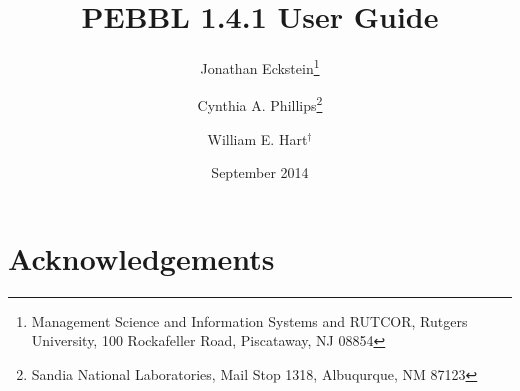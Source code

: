 \documentclass[12pt]{article}
\begin{document}
\title{
PEBBL 1.4.1 User Guide
}

\author{
Jonathan Eckstein\thanks{
Management Science and Information Systems and RUTCOR, Rutgers University,
100 Rockafeller Road, Piscataway, NJ 08854
}
\and
Cynthia A. Phillips\thanks{
Sandia National Laboratories, Mail Stop 1318, Albuqurque, NM 87123}
\and
William E. Hart$^{\dagger}$
}

\date{September 2014}

\maketitle

\begin{abstract}

\end{abstract}

\newpage

\tableofcontents

\newpage



\section*{Acknowledgements}





\end{document}
